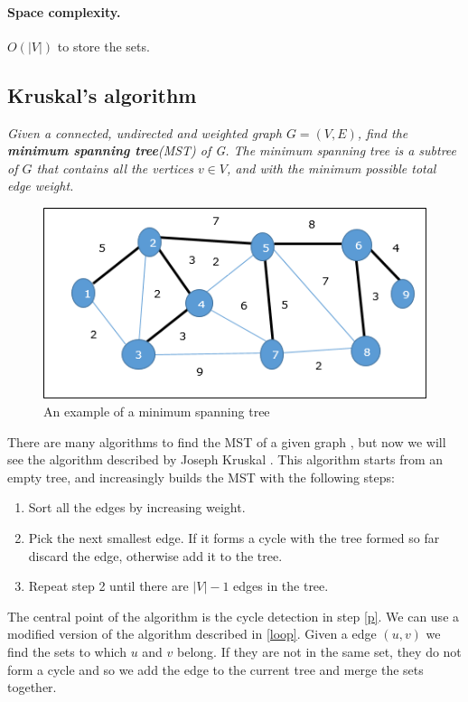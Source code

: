 \documentclass{article}
\begin{document}
\paragraph{Space complexity.} $O(|V|)$ to store the sets.

\subsection{Kruskal's algorithm}
\emph{Given a connected, undirected  and weighted  graph $G = (V,E)$,
find  the \textbf{minimum spanning tree}(MST) of G. The minimum spanning tree 
is a subtree of $G$ that contains all the vertices $v \in V$, and with the minimum possible total edge weight.}
    
\bigskip
\begin{figure}[h!]
    \centering
    \includegraphics[scale=0.8]{img/mst.png}
    \caption{An example of a minimum spanning tree}
\end{figure}
There are many algorithms to find the MST of a given graph \cite{prim1957shortest} \cite{nevsetvril2001otakar},
but now we will see the algorithm described by Joseph Kruskal \cite{kruskal1956shortest}.
This algorithm starts from an empty tree, and increasingly builds    the MST with the following steps:
\begin{enumerate}
    \item Sort all the edges by increasing weight.
    \item \label{p}Pick the next smallest edge. If it forms a cycle with the  tree formed so far discard the edge, otherwise
    add it to the tree.
    \item Repeat step 2 until there are $|V| - 1$ edges in the tree.
\end{enumerate}
The central point of the algorithm is the cycle detection in step \ref{p}. We can use a modified version of the algorithm described in \ref{loop}.
Given a edge $(u,v)$ we find the sets to which $u$ and $v$ belong. If they are not in the same set, they do not form a cycle 
and so we  add the edge to the current tree and merge the sets together. 
\end{document}
